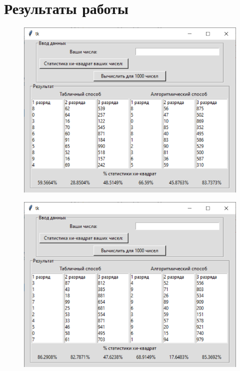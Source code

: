 \documentclass[12pt,a4paper,oneside]{report}
\begin{document}
\section*{Результаты работы}

\begin{figure}[H]
	\centering
	\includegraphics[scale=0.8]{1v.png}
	\label{fig:screenshot001}
\end{figure}

\begin{figure}[H]
	\centering
	\includegraphics[scale=0.8]{2v.png}
	\label{fig:screenshot002}
\end{figure}
\end{document}

